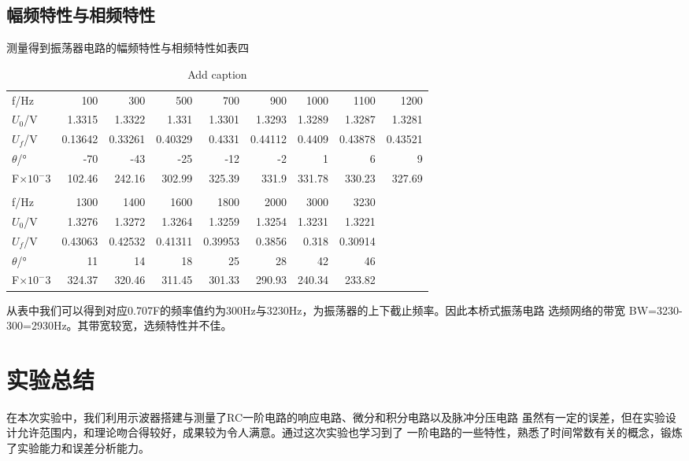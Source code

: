 \documentclass[a4paper,11pt,UTF8]{ctexart}
\begin{document}
\subsection{幅频特性与相频特性}
测量得到振荡器电路的幅频特性与相频特性如表四
\begin{table}[htbp]
	\centering
	\caption{Add caption}
	\begin{tabular}{lrrrrrrrr}
		f/Hz  & 100   & 300   & 500   & 700   & 900   & 1000  & 1100  & 1200 \\
		$U_0$/V & 1.3315 & 1.3322 & 1.331 & 1.3301 & 1.3293 & 1.3289 & 1.3287 & 1.3281 \\
		$U_f$/V & 0.13642 & 0.33261 & 0.40329 & 0.4331 & 0.44112 & 0.4409 & 0.43878 & 0.43521 \\
		$\theta$/° & -70   & -43   & -25   & -12   & -2    & 1     & 6     & 9 \\
		F$\times 10^-3$     & 102.46 & 242.16 & 302.99 & 325.39 & 331.9 & 331.78 & 330.23 & 327.69 \\
		&       &       &       &       &       &       &       &  \\
		f/Hz  & 1300  & 1400  & 1600  & 1800  & 2000  & 3000  & 3230  &  \\
		$U_0$/V & 1.3276 & 1.3272 & 1.3264 & 1.3259 & 1.3254 & 1.3231 & 1.3221 &  \\
		$U_f$/V & 0.43063 & 0.42532 & 0.41311 & 0.39953 & 0.3856 & 0.318 & 0.30914 &  \\
		$\theta$/° & 11    & 14    & 18    & 25    & 28    & 42    & 46    &  \\
		F$\times 10^-3$     & 324.37 & 320.46 & 311.45 & 301.33 & 290.93 & 240.34 & 233.82 &  \\
	\end{tabular}%
	\label{tab:addlabel}%
\end{table}%
从表中我们可以得到对应0.707F的频率值约为300Hz与3230Hz，为振荡器的上下截止频率。因此本桥式振荡电路
选频网络的带宽 BW=3230-300=2930Hz。其带宽较宽，选频特性并不佳。





\section{实验总结}
在本次实验中，我们利用示波器搭建与测量了RC一阶电路的响应电路、微分和积分电路以及脉冲分压电路
虽然有一定的误差，但在实验设计允许范围内，和理论吻合得较好，成果较为令人满意。通过这次实验也学习到了
一阶电路的一些特性，熟悉了时间常数有关的概念，锻炼了实验能力和误差分析能力。
\newpage
\end{document}
